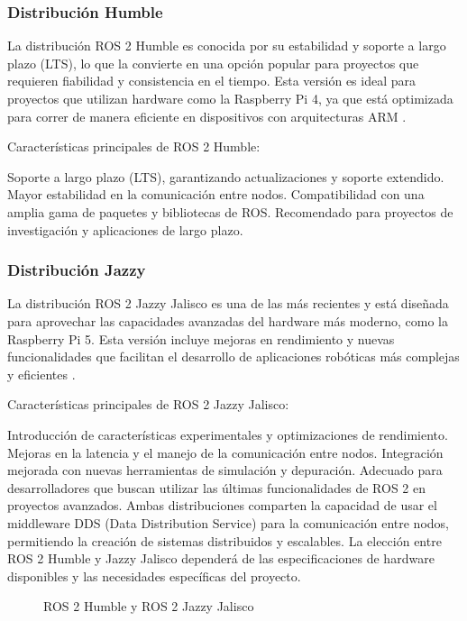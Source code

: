    \subsubsection{Distribución Humble}

    La distribución ROS 2 Humble es conocida por su estabilidad y soporte a largo plazo (LTS), lo que la convierte en una opción popular para proyectos que requieren fiabilidad y consistencia en el tiempo. Esta versión es ideal para proyectos que utilizan hardware como la Raspberry Pi 4, ya que está optimizada para correr de manera eficiente en dispositivos con arquitecturas ARM \cite{humble_documentation}.

    Características principales de ROS 2 Humble:

    Soporte a largo plazo (LTS), garantizando actualizaciones y soporte extendido.
    Mayor estabilidad en la comunicación entre nodos.
    Compatibilidad con una amplia gama de paquetes y bibliotecas de ROS.
    Recomendado para proyectos de investigación y aplicaciones de largo plazo.
    \subsubsection{Distribución Jazzy}

    La distribución ROS 2 Jazzy Jalisco es una de las más recientes y está diseñada para aprovechar las capacidades avanzadas del hardware más moderno, como la Raspberry Pi 5. Esta versión incluye mejoras en rendimiento y nuevas funcionalidades que facilitan el desarrollo de aplicaciones robóticas más complejas y eficientes \cite{jazzy_documentation}.

    Características principales de ROS 2 Jazzy Jalisco:

    Introducción de características experimentales y optimizaciones de rendimiento.
    Mejoras en la latencia y el manejo de la comunicación entre nodos.
    Integración mejorada con nuevas herramientas de simulación y depuración.
    Adecuado para desarrolladores que buscan utilizar las últimas funcionalidades de ROS 2 en proyectos avanzados.
    Ambas distribuciones comparten la capacidad de usar el middleware DDS (Data Distribution Service) para la comunicación entre nodos, permitiendo la creación de sistemas distribuidos y escalables. La elección entre ROS 2 Humble y Jazzy Jalisco dependerá de las especificaciones de hardware disponibles y las necesidades específicas del proyecto.

    \begin{figure}[h!] 
    \centering 
    \caption{ROS 2 Humble y ROS 2 Jazzy Jalisco} 
    \label{fig} 
    \end{figure}


